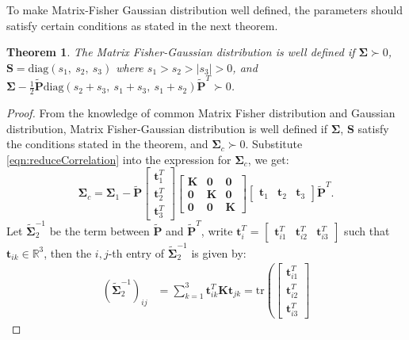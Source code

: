 \documentclass[12pt]{article}
\newtheorem{theorem}{Theorem}
\begin{document}
To make Matrix-Fisher Gaussian distribution well defined, the parameters should satisfy certain conditions as stated in the next theorem.
\begin{theorem} \label{thm:PTildeRange}
	The Matrix Fisher-Gaussian distribution is well defined if $\mathbf{\Sigma}\succ 0$, $\mathbf{S}=\mathrm{diag}(s_1,\ s_2,\ s_3)$ where $s_1>s_2>|s_3|>0$, and $\mathbf{\Sigma}-\frac{1}{2}\tilde{\mathbf{P}}\mathrm{diag}(s_2+s_3,\ s_1+s_3,\ s_1+s_2)\tilde{\mathbf{P}}^T \succ 0$.
\end{theorem}
\begin{proof}
	From the knowledge of common Matrix Fisher distribution and Gaussian distribution, Matrix Fisher-Gaussian distribution is well defined if $\mathbf{\Sigma}$, $\mathbf{S}$ satisfy the conditions stated in the theorem, and $\mathbf{\Sigma}_c\succ 0$.
	Substitute \eqref{eqn:reduceCorrelation} into the expression for $\mathbf{\Sigma}_c$, we get:
	\begin{equation}
		\mathbf{\Sigma}_c = \mathbf{\Sigma}_1 - \tilde{\mathbf{P}}\begin{bmatrix}
			\bm{t}^T_1 \\ \bm{t}^T_2 \\ \bm{t}^T_3
		\end{bmatrix}\begin{bmatrix}
			\mathbf{K} & \mathbf{0} & \mathbf{0} \\
			\mathbf{0} & \mathbf{K} & \mathbf{0} \\
			\mathbf{0} & \mathbf{0} & \mathbf{K}
		\end{bmatrix}\begin{bmatrix}
			\bm{t}_1 & \bm{t}_2 & \bm{t}_3
		\end{bmatrix}\tilde{\mathbf{P}}^T.
	\end{equation}
	Let $\tilde{\mathbf{\Sigma}}^{-1}_2$ be the term between $\tilde{\mathbf{P}}$ and $\tilde{\mathbf{P}}^T$, write $\bm{t}^T_i$ = $\begin{bmatrix}\bm{t}^T_{i1}&\bm{t}^T_{i2}&\bm{t}^T_{i3}\end{bmatrix}$ such that $\bm{t}_{ik}\in\mathbb{R}^3$, then the $i,j$-th entry of $\tilde{\mathbf{\Sigma}}^{-1}_2$ is given by:
	\begin{equation} \label{eqn:sigma2Entry}
		\begin{split}
			(\tilde{\mathbf{\Sigma}}^{-1}_2)_{ij} &= \sum_{k=1}^{3}\bm{t}^T_{ik}\mathbf{K}\bm{t}_{jk} = \mathrm{tr}\left(\begin{bmatrix}
				\bm{t}^T_{i1} \\ \bm{t}^T_{i2} \\ \bm{t}^T_{i3}

\end{bmatrix}
\end{split}
\end{equation}
\end{proof}
\end{document}
